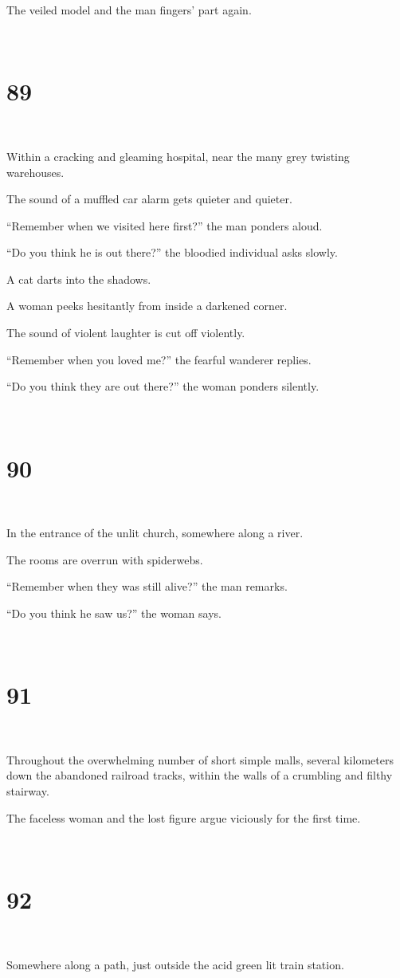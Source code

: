 \documentclass{report}
\begin{document}
The veiled model and the man fingers' part again.

~
\chapter*{89}
~

Within a cracking and gleaming hospital, near the many grey twisting warehouses.

The sound of a muffled car alarm gets quieter and quieter.

``Remember when we visited here first?'' the man ponders aloud.

``Do you think he is out there?'' the bloodied individual asks slowly.

A cat darts into the shadows.

A woman peeks hesitantly from inside a darkened corner.

The sound of violent laughter is cut off violently.

``Remember when you loved me?'' the fearful wanderer replies.

``Do you think they are out there?'' the woman ponders silently.

~
\chapter*{90}
~

In the entrance of the unlit church, somewhere along a river.

The rooms are overrun with spiderwebs.

``Remember when they was still alive?'' the man remarks.

``Do you think he saw us?'' the woman says.

~
\chapter*{91}
~

Throughout the overwhelming number of short simple malls, several kilometers down the abandoned railroad tracks, within the walls of a crumbling and filthy stairway.

The faceless woman and the lost figure argue viciously for the first time.

~
\chapter*{92}
~

Somewhere along a path, just outside the acid green lit train station.
\end{document}
